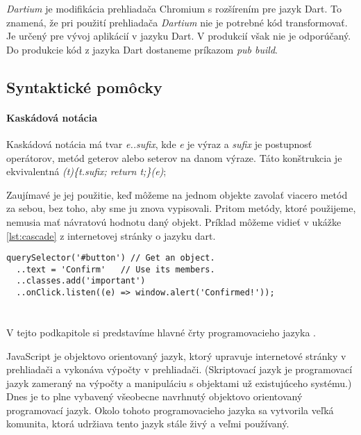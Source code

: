 \emph{Dartium} je modifikácia prehliadača Chromium s rozšírením pre jazyk Dart. To znamená, že pri použití prehliadača \emph{Dartium} nie je potrebné kód transformovať. Je určený pre vývoj aplikácií v jazyku Dart. V produkcií však nie je odporúčaný. Do produkcie kód z jazyka Dart dostaneme príkazom \emph{pub build}.%

\subsection{Syntaktické pomôcky}

\paragraph{Kaskádová notácia}
Kaskádová notácia má tvar \emph{e..sufix}, kde \emph{e} je výraz a \emph{sufix} je postupnosť operátorov, metód geterov alebo seterov na danom výraze. Táto konštrukcia je ekvivalentná \emph{(t)\{t.sufix; return t;\}(e)};

Zaujímavé je jej použitie, keď môžeme na jednom objekte zavolať viacero metód za sebou, bez toho, aby sme ju znova vypisovali. Pritom metódy, ktoré použijeme, nemusia mať návratovú hodnotu daný objekt. Príklad môžeme vidieť v ukážke \ref{lst:cascade} z internetovej stránky o jazyku dart\cite{dartLanguageTour}.

\begin{lstlisting}[caption=Kaskádová notácia, label={lst:cascade}]
querySelector('#button') // Get an object.
  ..text = 'Confirm'   // Use its members.
  ..classes.add('important')
  ..onClick.listen((e) => window.alert('Confirmed!'));
\end{lstlisting}







\section{\JS{}}
V tejto podkapitole si predstavíme hlavné črty programovacieho jazyka \JS{}. 

JavaScript je objektovo orientovaný jazyk, ktorý upravuje internetové stránky v prehliadači a vykonáva výpočty v prehliadači.
(Skriptovací jazyk je programovací jazyk zameraný na výpočty a manipuláciu s objektami už existujúceho systému.)
Dnes je to plne vybavený všeobecne navrhnutý objektovo orientovaný programovací jazyk.
Okolo tohoto programovacieho jazyka sa vytvorila veľká komunita, ktorá udržiava tento jazyk stále živý a veľmi používaný.

